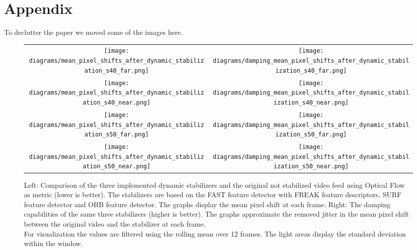 
\newpage

\section{Appendix}
To declutter the paper we moved some of the images here.

\begin{figure*}[!ht]
    \begin{tabular}{cc}
      \texttt{[image: diagrams/mean\_pixel\_shifts\_after\_dynamic\_stabilization\_s40\_far.png]}    &  
      \texttt{[image: diagrams/damping\_mean\_pixel\_shifts\_after\_dynamic\_stabilization\_s40\_far.png]}   \\ 

      \texttt{[image: diagrams/mean\_pixel\_shifts\_after\_dynamic\_stabilization\_s40\_near.png]}    &  
      \texttt{[image: diagrams/damping\_mean\_pixel\_shifts\_after\_dynamic\_stabilization\_s40\_near.png]}      \\

      \texttt{[image: diagrams/mean\_pixel\_shifts\_after\_dynamic\_stabilization\_s50\_far.png]}    &  
      \texttt{[image: diagrams/damping\_mean\_pixel\_shifts\_after\_dynamic\_stabilization\_s50\_far.png]}    \\

      \texttt{[image: diagrams/mean\_pixel\_shifts\_after\_dynamic\_stabilization\_s50\_near.png]}    &  
      \texttt{[image: diagrams/damping\_mean\_pixel\_shifts\_after\_dynamic\_stabilization\_s50\_near.png]}    
    \end{tabular}
    \caption{
        Left: 
        Comparison of the three implemented dynamic stabilizers and the original not stabilized video feed using Optical Flow as metric (lower is better).
        The stabilizers are based on the 
        FAST \cite{Ghahremani_2021,opencv_library} feature detector with FREAK \cite{alahi6247715,opencv_library} feature descriptors,
        SURF \cite{bay10.1007/11744023_32,opencv_library} feature detector and
        ORB \cite{rublee6126544, opencv_library} feature detector.
        The graphs display the mean pixel shift at each frame. 
        Right: 
        The damping capabilities of the same three stabilizers (higher is better). 
        The graphs approximate the removed jitter in the mean pixel shift between the original video and the stabilizer at each frame.\\
        For visualization the values are filtered using the rolling mean over 12 frames. 
        The light areas display the standard deviation within the window.
    }
    \label{fig:dynamic_stabilization_appendix}
    \end{figure*}

    
